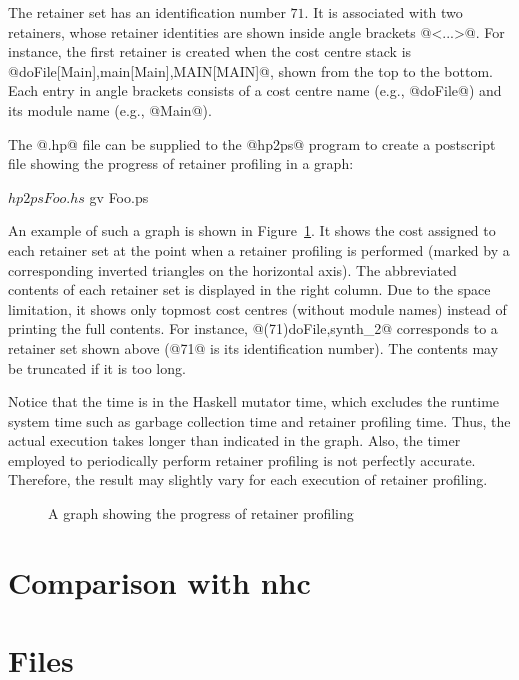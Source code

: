 \documentclass{article}
\begin{document}
The retainer set has an identification number $71$.
It is associated with two retainers, whose retainer identities are shown 
inside angle brackets @<...>@.
For instance, the first retainer is created when the cost centre stack
is @doFile[Main],main[Main],MAIN[MAIN]@, shown from the top to the bottom.
Each entry in angle brackets consists of a cost centre name (e.g., @doFile@) 
and its module name (e.g., @Main@).

The @.hp@ file can be supplied to the @hp2ps@ program to create a postscript 
file showing the progress of retainer profiling in a graph:

\begin{code}
$ hp2ps Foo.hs
$ gv Foo.ps
\end{code}

An example of such a graph is shown in Figure~\ref{fig-cacheprof}.
It shows the cost assigned to each retainer set at the point 
when a retainer profiling is performed (marked by a corresponding inverted 
triangles on the horizontal axis). 
The abbreviated contents of each retainer set is displayed in the right column.
Due to the space limitation,
it shows only topmost cost centres (without module names)
instead of printing the full contents.
For instance, @(71)doFile,synth_2@ corresponds to a retainer set shown above 
(@71@ is its identification number).
The contents may be truncated if it is too long. 

Notice that the time is in the Haskell mutator time, which excludes 
the runtime system time such as garbage collection time and retainer profiling
time. Thus, the actual execution takes longer than indicated in the
graph. Also, the timer employed to periodically perform retainer profiling
is not perfectly accurate. Therefore, the result may slightly vary for each
execution of retainer profiling.

\begin{figure}[ht]
\centering
{}
\caption{A graph showing the progress of retainer profiling}
\label{fig-cacheprof}
\end{figure}

\section{Comparison with nhc}

\section{Files}
\end{document}
